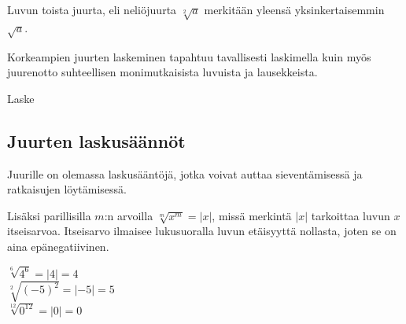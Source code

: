 Luvun toista juurta, eli neliöjuurta $\sqrt[2]{a}$ merkitään yleensä yksinkertaisemmin $\sqrt{a}$.


Korkeampien juurten laskeminen tapahtuu tavallisesti laskimella kuin myös juurenotto suhteellisen monimutkaisista luvuista ja lausekkeista.

\begin{esimerkki}
Laske

	\begin{esimratk}
	\end{esimratk}
	
	\begin{esimvast}
	\end{esimvast}
\end{esimerkki}

\subsection*{Juurten laskusäännöt}
Juurille on olemassa laskusääntöjä, jotka voivat auttaa sieventämisessä ja ratkaisujen löytämisessä. 

Lisäksi parillisilla $m$:n arvoilla $\sqrt[m]{x^m}=|x|$, missä merkintä $|x|$ tarkoittaa luvun $x$ itseisarvoa. Itseisarvo ilmaisee lukusuoralla luvun etäisyyttä nollasta, joten se on aina epänegatiivinen.

\begin{esimerkki}
$\sqrt[6]{4^6}=|4| = 4$\\
$\sqrt[2]{(-5)^2}=|-5| = 5$\\
$\sqrt[12]{0^{12}}=|0|=0$
\end{esimerkki}

